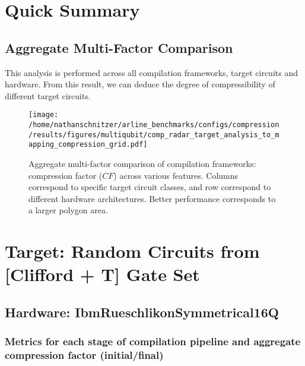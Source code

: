 \documentclass{report}%
\begin{document}
%
\chapter{Quick Summary}%
\label{chap:QuickSummary}%
\section{Aggregate Multi{-}Factor Comparison}%
\label{sec:AggregateMulti{-}FactorComparison}%
This analysis is performed across all compilation frameworks, target circuits and hardware.
                        From this result, we can deduce the degree of compressibility of different target
                        circuits. \bigskip



\begin{figure}[h!]%
\centering%
\texttt{[image: /home/nathanschnitzer/arline\_benchmarks/configs/compression/results/figures/multiqubit/comp\_radar\_target\_analysis\_to\_mapping\_compression\_grid.pdf]}%
\caption{Aggregate multi-factor comparison of compilation frameworks: compression factor
                                ($CF$) across various features. Columns correspond to specific target circuit classes,
                                and row correspond to different hardware architectures. Better performance corresponds
                                to a larger polygon area.}%
\end{figure}

%
\chapter{Target: Random Circuits from [Clifford + T] Gate Set}%
\label{chap:TargetRandomCircuitsfromClifford+TGateSet}%
\section{Hardware: IbmRueschlikonSymmetrical16Q}%
\label{sec:HardwareIbmRueschlikonSymmetrical16Q}%

%
\subsection*{Metrics for each stage of compilation pipeline and aggregate compression factor
                    (initial/final)}%
\label{subsec:Metricsforeachstageofcompilationpipelineandaggregatecompressionfactor(initial/final)}%
\end{document}
